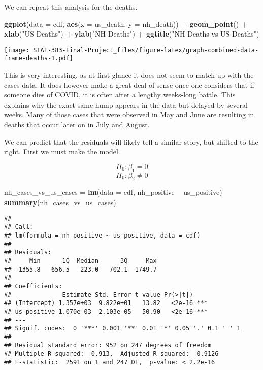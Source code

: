 \documentclass[
]{article}
\newenvironment{Shaded}{\begin{snugshade}}{\end{snugshade}}
\newcommand{\DataTypeTok}[1]{\textcolor[rgb]{0.13,0.29,0.53}{#1}}
\newcommand{\KeywordTok}[1]{\textcolor[rgb]{0.13,0.29,0.53}{\textbf{#1}}}
\newcommand{\NormalTok}[1]{#1}
\newcommand{\OperatorTok}[1]{\textcolor[rgb]{0.81,0.36,0.00}{\textbf{#1}}}
\newcommand{\StringTok}[1]{\textcolor[rgb]{0.31,0.60,0.02}{#1}}
\begin{document}
We can repeat this analysis for the deaths.

\begin{Shaded}
\begin{Highlighting}[]
\KeywordTok{ggplot}\NormalTok{(}\DataTypeTok{data =}\NormalTok{ cdf, }\KeywordTok{aes}\NormalTok{(}\DataTypeTok{x =}\NormalTok{ us_death, }\DataTypeTok{y =}\NormalTok{ nh_death)) }\OperatorTok{+}\StringTok{ }\KeywordTok{geom_point}\NormalTok{() }\OperatorTok{+}\StringTok{ }\KeywordTok{xlab}\NormalTok{(}\StringTok{"US Deaths"}\NormalTok{) }\OperatorTok{+}\StringTok{ }\KeywordTok{ylab}\NormalTok{(}\StringTok{"NH Deaths"}\NormalTok{) }\OperatorTok{+}\StringTok{ }\KeywordTok{ggtitle}\NormalTok{(}\StringTok{"NH Deaths vs US Deaths"}\NormalTok{)}
\end{Highlighting}
\end{Shaded}

\texttt{[image: STAT-383-Final-Project\_files/figure-latex/graph-combined-data-frame-deaths-1.pdf]}

This is very interesting, as at first glance it does not seem to match
up with the cases data. It does however make a great deal of sense once
one considers that if someone dies of COVID, it is often after a lengthy
weeks-long battle. This explains why the exact same hump appears in the
data but delayed by several weeks. Many of those cases that were
observed in May and June are resulting in deaths that occur later on in
July and August.

We can predict that the residuals will likely tell a similar story, but
shifted to the right. First we must make the model.

\[H_{0}: \beta_{1} = 0\] \[H_{0}: \beta_{2} \neq 0\]

\begin{Shaded}
\begin{Highlighting}[]
\NormalTok{nh_cases_vs_us_cases =}\StringTok{ }\KeywordTok{lm}\NormalTok{(}\DataTypeTok{data =}\NormalTok{ cdf, nh_positive }\OperatorTok{~}\StringTok{ }\NormalTok{us_positive)}
\KeywordTok{summary}\NormalTok{(nh_cases_vs_us_cases)}
\end{Highlighting}
\end{Shaded}

\begin{verbatim}
## 
## Call:
## lm(formula = nh_positive ~ us_positive, data = cdf)
## 
## Residuals:
##     Min      1Q  Median      3Q     Max 
## -1355.8  -656.5  -223.0   702.1  1749.7 
## 
## Coefficients:
##              Estimate Std. Error t value Pr(>|t|)    
## (Intercept) 1.357e+03  9.822e+01   13.82   <2e-16 ***
## us_positive 1.070e-03  2.103e-05   50.90   <2e-16 ***
## ---
## Signif. codes:  0 '***' 0.001 '**' 0.01 '*' 0.05 '.' 0.1 ' ' 1
## 
## Residual standard error: 952 on 247 degrees of freedom
## Multiple R-squared:  0.913,  Adjusted R-squared:  0.9126 
## F-statistic:  2591 on 1 and 247 DF,  p-value: < 2.2e-16
\end{verbatim}
\end{document}
